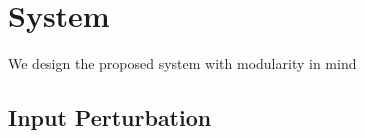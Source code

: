 \section{System}
We design the proposed system with modularity in mind
\subsection{Input Perturbation}


